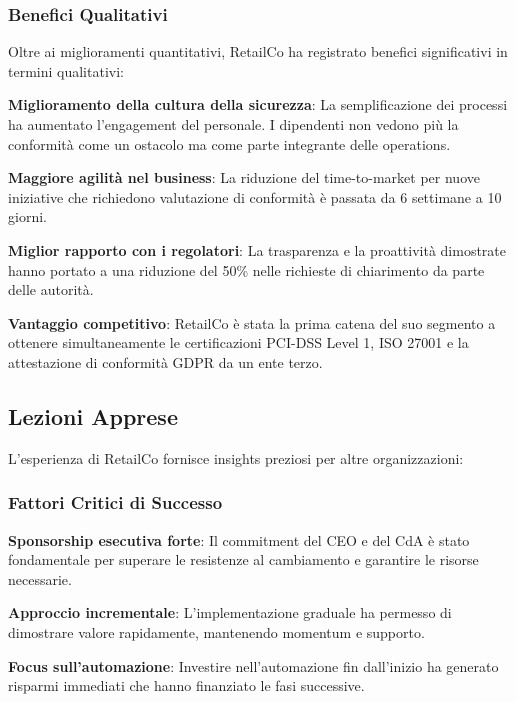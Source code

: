 \subsubsection{\texorpdfstring{Benefici Qualitativi}{4.7.3.2 - Benefici Qualitativi}}

Oltre ai miglioramenti quantitativi, RetailCo ha registrato benefici significativi in termini qualitativi:

\textbf{Miglioramento della cultura della sicurezza}: La semplificazione dei processi ha aumentato l'engagement del personale. I dipendenti non vedono più la conformità come un ostacolo ma come parte integrante delle operations.

\textbf{Maggiore agilità nel business}: La riduzione del time-to-market per nuove iniziative che richiedono valutazione di conformità è passata da 6 settimane a 10 giorni.

\textbf{Miglior rapporto con i regolatori}: La trasparenza e la proattività dimostrate hanno portato a una riduzione del 50\% nelle richieste di chiarimento da parte delle autorità.

\textbf{Vantaggio competitivo}: RetailCo è stata la prima catena del suo segmento a ottenere simultaneamente le certificazioni PCI-DSS Level 1, ISO 27001 e la attestazione di conformità GDPR da un ente terzo.

\subsection{\texorpdfstring{Lezioni Apprese}{4.7.4 - Lezioni Apprese}}
\label{subsec:4.7.4_lezioni}

L'esperienza di RetailCo fornisce insights preziosi per altre organizzazioni:

\subsubsection{\texorpdfstring{Fattori Critici di Successo}{4.7.4.1 - Fattori Critici di Successo}}

\textbf{Sponsorship esecutiva forte}: Il commitment del CEO e del CdA è stato fondamentale per superare le resistenze al cambiamento e garantire le risorse necessarie.

\textbf{Approccio incrementale}: L'implementazione graduale ha permesso di dimostrare valore rapidamente, mantenendo momentum e supporto.

\textbf{Focus sull'automazione}: Investire nell'automazione fin dall'inizio ha generato risparmi immediati che hanno finanziato le fasi successive.

